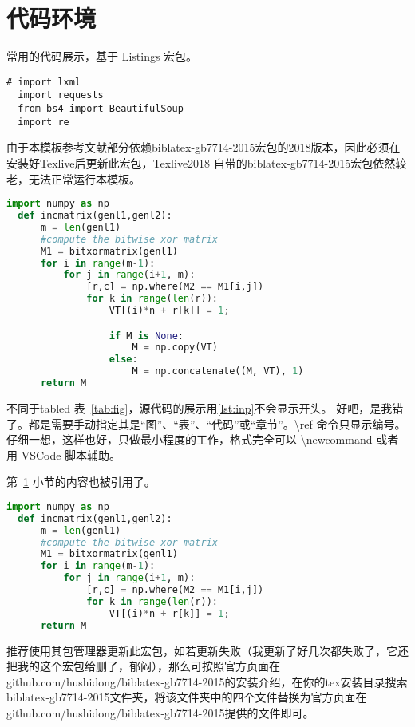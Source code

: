 \documentclass[../Main/thesis]{subfiles}
\begin{document}
\section{代码环境} \label{sec:code}
常用的代码展示，基于 Listings 宏包。
\begin{lstlisting}[style=monocolor,
  caption={first lst env},
  label={no label},
  name=测试第一个代码,
  language=PythonPlus]
  # import lxml
  import requests
  from bs4 import BeautifulSoup
  import re
\end{lstlisting}

由于本模板参考文献部分依赖biblatex-gb7714-2015宏包的2018版本，因此必须在安装好Texlive后更新此宏包，Texlive2018 自带的biblatex-gb7714-2015宏包依然较老，无法正常运行本模板。

\begin{lstlisting}[language=Python,
  caption=Second CODE Block,
  label=lst:2nd,
  style=colored]
  import numpy as np
  def incmatrix(genl1,genl2):
      m = len(genl1)
      #compute the bitwise xor matrix
      M1 = bitxormatrix(genl1)
      for i in range(m-1):
          for j in range(i+1, m):
              [r,c] = np.where(M2 == M1[i,j])
              for k in range(len(r)):
                  VT[(i)*n + r[k]] = 1;

                  if M is None:
                      M = np.copy(VT)
                  else:
                      M = np.concatenate((M, VT), 1)
      return M
\end{lstlisting}

不同于tabled 表~\ref{tab:fig}，源代码的展示用\ref{lst:inp}不会显示开头。
好吧，是我错了。都是需要手动指定其是“图”、“表”、“代码”或“章节”。\textbackslash ref 命令只显示编号。
仔细一想，这样也好，只做最小程度的工作，格式完全可以 \textbackslash newcommand 或者用 VSCode 脚本辅助。

第~\ref{sec:code} 小节的内容也被引用了。

\begin{lstlisting}[language=Python,
  caption=中文标题没有括号,
  label=lst:outer,
  style=colorEX]
  import numpy as np
  def incmatrix(genl1,genl2):
      m = len(genl1)
      #compute the bitwise xor matrix
      M1 = bitxormatrix(genl1)
      for i in range(m-1):
          for j in range(i+1, m):
              [r,c] = np.where(M2 == M1[i,j])
              for k in range(len(r)):
                  VT[(i)*n + r[k]] = 1;
      return M
\end{lstlisting}

推荐使用其包管理器更新此宏包，如若更新失败（我更新了好几次都失败了，它还把我的这个宏包给删了，郁闷），那么可按照官方页面在github.com/hushidong/biblatex-gb7714-2015的安装介绍，在你的tex安装目录搜索biblatex-gb7714-2015文件夹，将该文件夹中的四个文件替换为官方页面在github.com/hushidong/biblatex-gb7714-2015提供的文件即可。
\end{document}
